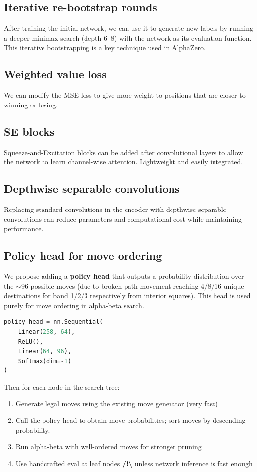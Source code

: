 \documentclass[11pt,a4paper]{article}
\begin{document}
\subsection{Iterative re-bootstrap rounds}
After training the initial network, we can use it to generate new labels by running a deeper minimax search (depth 6--8) with the network as its evaluation function. This iterative bootstrapping is a key technique used in AlphaZero.

\subsection{Weighted value loss}
We can modify the MSE loss to give more weight to positions that are closer to winning or losing.

\subsection{SE blocks}
Squeeze-and-Excitation blocks can be added after convolutional layers to allow the network to learn channel-wise attention. Lightweight and easily integrated.

\subsection{Depthwise separable convolutions}
Replacing standard convolutions in the encoder with depthwise separable convolutions can reduce parameters and computational cost while maintaining performance.

\subsection{Policy head for move ordering}
We propose adding a \textbf{policy head} that outputs a probability distribution over the $\sim$96 possible moves (due to broken-path movement reaching 4/8/16 unique destinations for band 1/2/3 respectively from interior squares). This head is used purely for move ordering in alpha-beta search.

\begin{lstlisting}[language=Python]
policy_head = nn.Sequential(
    Linear(258, 64),
    ReLU(),
    Linear(64, 96),
    Softmax(dim=-1)
)
\end{lstlisting}

Then for each node in the search tree:
\begin{enumerate}
  \item Generate legal moves using the existing move generator (very fast)
  \item Call the policy head to obtain move probabilities; sort moves by descending probability.
  \item Run alpha-beta with well-ordered moves for stronger pruning
  \item Use handcrafted eval at leaf nodes \textbf{/!\textbackslash} unless network inference is fast enough
\end{enumerate}
\end{document}
